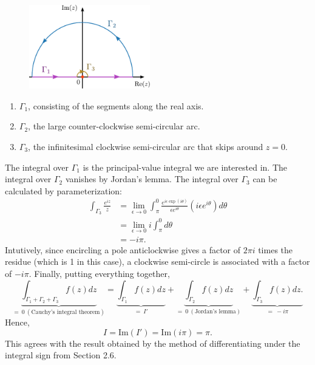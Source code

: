 \documentclass[10pt,a4paper]{article}
\begin{document}
\begin{figure}[ht]
  \centering\includegraphics[width=0.47\textwidth]{principal_value_integral}
\end{figure}

\begin{enumerate}
\item
  $\Gamma_1$, consisting of the segments along the real axis.

\item
  $\Gamma_2$, the large counter-clockwise semi-circular arc.

\item
  $\Gamma_3$, the infinitesimal clockwise semi-circular arc that skips around $z = 0$.
\end{enumerate}

The integral over $\Gamma_1$ is the principal-value integral we are
interested in.  The integral over $\Gamma_2$ vanishes by Jordan's
lemma. The integral over $\Gamma_3$ can be calculated by
parameterization:
\begin{align}
  \int_{\Gamma_3} \frac{e^{iz}}{z}
  &= \lim_{\epsilon \rightarrow 0} \int_{\pi}^{0} \frac{e^{i\epsilon \exp(i\theta)}}{\epsilon e^{i\theta}} \left(i\epsilon e^{i\theta}\right) d\theta \\
  &= \lim_{\epsilon \rightarrow 0} i \int_{\pi}^0 d\theta \\
  &= - i\pi.
\end{align}
Intutively, since encircling a pole anticlockwise gives a factor of
$2\pi i$ times the residue (which is 1 in this case), a clockwise
semi-circle is associated with a factor of $- i \pi$. Finally, putting
everything together,
\begin{equation}
  \underbrace{\int_{\Gamma_1 + \Gamma_2 + \Gamma_3} f(z) dz}_{ =~0~(\text{Cauchy's integral theorem})}
  = \underbrace{\int_{\Gamma_1} f(z) dz}_{=~I'}
  + \underbrace{\int_{\Gamma_2} f(z) dz}_{=~0~(\text{Jordan's lemma})}
  + \underbrace{\int_{\Gamma_3} f(z) dz.}_{=~-i \pi}
\end{equation}
Hence,
\begin{equation}
  I = \mathrm{Im}(I') = \mathrm{Im}(i\pi) = \pi.
\end{equation}
This agrees with the result obtained by the method of differentiating
under the integral sign from Section 2.6.
\end{document}
